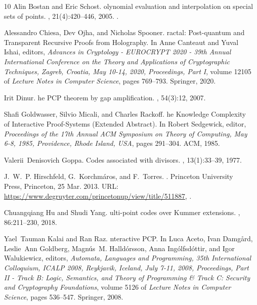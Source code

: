 \begin{thebibliography}{10}
Alin {Bostan} and Eric {Schost}.
olynomial evaluation and interpolation on special sets of points.
, 21(4):420--446, 2005.
\newblock \href {https://doi.org/10.1016/j.jco.2004.09.009}
  {}.

Alessandro Chiesa, Dev Ojha, and Nicholas Spooner.
ractal: {P}ost-quantum and {T}ransparent {R}ecursive {P}roofs from
  {H}olography.
\newblock In Anne Canteaut and Yuval Ishai, editors, {\em Advances in
  Cryptology - {EUROCRYPT} 2020 - 39th Annual International Conference on the
  Theory and Applications of Cryptographic Techniques, Zagreb, Croatia, May
  10-14, 2020, Proceedings, Part {I}}, volume 12105 of {\em Lecture Notes in
  Computer Science}, pages 769--793. Springer, 2020.

Irit Dinur.
he {{P}{C}{P}} theorem by gap amplification.
, 54(3):12, 2007.

Shafi Goldwasser, Silvio Micali, and Charles Rackoff.
he {K}nowledge {C}omplexity of {I}nteractive {P}roof-{S}ystems
  ({E}xtended {A}bstract).
\newblock In Robert Sedgewick, editor, {\em Proceedings of the 17th Annual
  {ACM} Symposium on Theory of Computing, May 6-8, 1985, Providence, Rhode
  Island, {USA}}, pages 291--304. {ACM}, 1985.

Valerii~Denisovich Goppa.
\newblock Codes associated with divisors.
, 13(1):33--39, 1977.

J.~W.~P. Hirschfeld, G.~Korchmáros, and F.~Torres.
.
\newblock Princeton University Press, Princeton, 25 Mar. 2013.
\newblock URL: \url{https://www.degruyter.com/princetonup/view/title/511887},
  \href {https://doi.org/10.1515/9781400847419}
  {}.

Chuangqiang {Hu} and Shudi {Yang}.
ulti-point codes over {K}ummer extensions.
, 86:211--230, 2018.

Yael~Tauman Kalai and Ran Raz.
nteractive {{P}{C}{P}}.
\newblock In Luca Aceto, Ivan Damg{\aa}rd, Leslie~Ann Goldberg, Magn{\'{u}}s~M.
  Halld{\'{o}}rsson, Anna Ing{\'{o}}lfsd{\'{o}}ttir, and Igor Walukiewicz,
  editors, {\em Automata, Languages and Programming, 35th International
  Colloquium, {ICALP} 2008, Reykjavik, Iceland, July 7-11, 2008, Proceedings,
  Part {II} - Track {B:} Logic, Semantics, and Theory of Programming {\&} Track
  {C:} Security and Cryptography Foundations}, volume 5126 of {\em Lecture
  Notes in Computer Science}, pages 536--547. Springer, 2008.


\end{thebibliography}
